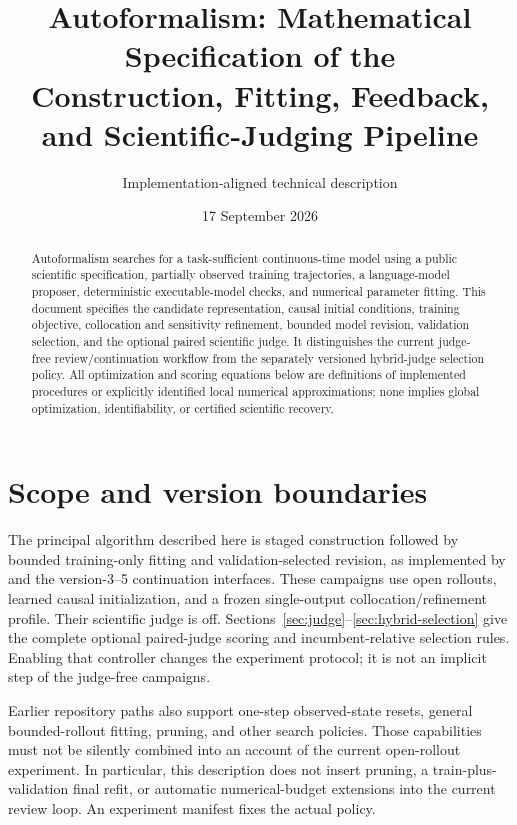 \documentclass[11pt]{article}
\title{Autoformalism: Mathematical Specification of the\protect\\
Construction, Fitting, Feedback, and Scientific-Judging Pipeline}
\author{Implementation-aligned technical description}
\date{17 September 2026}
\begin{document}
\maketitle
\begin{abstract}
Autoformalism searches for a task-sufficient continuous-time model using a public
scientific specification, partially observed training trajectories, a language-model
proposer, deterministic executable-model checks, and numerical parameter fitting.
This document specifies the candidate representation, causal initial conditions,
training objective, collocation and sensitivity refinement, bounded model revision,
validation selection, and the optional paired scientific judge. It distinguishes
the current judge-free review/continuation workflow from the separately versioned
hybrid-judge selection policy. All optimization and scoring equations below are
definitions of implemented procedures or explicitly identified local numerical
approximations; none implies global optimization, identifiability, or certified
scientific recovery.
\end{abstract}
\tableofcontents
\newpage

\section{Scope and version boundaries}
\label{sec:scope}

The principal algorithm described here is staged construction followed by bounded
training-only fitting and validation-selected revision, as implemented by
 and the version-3--5 continuation interfaces.
These campaigns use open rollouts, learned causal initialization, and a frozen
single-output collocation/refinement profile. Their scientific judge is off.
Sections~\ref{sec:judge}--\ref{sec:hybrid-selection} give the complete optional
paired-judge scoring and incumbent-relative selection rules. Enabling that
controller changes the experiment protocol; it is not an implicit step of the
judge-free campaigns.

Earlier repository paths also support one-step observed-state resets, general
bounded-rollout fitting, pruning, and other search policies. Those capabilities
must not be silently combined into an account of the current open-rollout
experiment. In particular, this description does not insert pruning, a
train-plus-validation final refit, or automatic numerical-budget extensions into
the current review loop. An experiment manifest fixes the actual policy.
\end{document}
